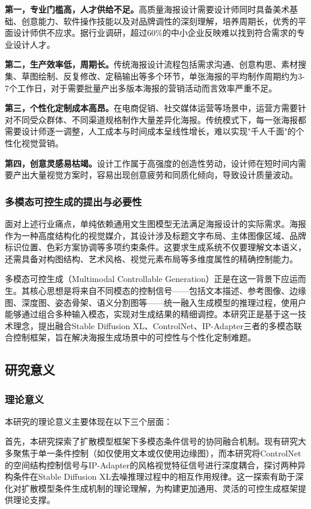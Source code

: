 \documentclass[12pt,a4paper]{ctexart}
\newcommand{\sdxl}{Stable Diffusion XL}
\newcommand{\controlnet}{ControlNet}
\newcommand{\ipadapter}{IP-Adapter}
\begin{document}
\textbf{第一，专业门槛高，人才供给不足。}高质量海报设计需要设计师同时具备美术基础、创意能力、软件操作技能以及对品牌调性的深刻理解，培养周期长，优秀的平面设计师供不应求。据行业调研，超过60\%的中小企业反映难以找到符合需求的专业设计人才。

\textbf{第二，生产效率低，周期长。}传统海报设计流程包括需求沟通、创意构思、素材搜集、草图绘制、反复修改、定稿输出等多个环节，单张海报的平均制作周期约为3-7个工作日，对于需要批量产出多版本海报的营销活动而言效率严重不足。

\textbf{第三，个性化定制成本高昂。}在电商促销、社交媒体运营等场景中，运营方需要针对不同受众群体、不同渠道规格制作大量差异化海报。传统模式下，每一张海报都需要设计师逐一调整，人工成本与时间成本呈线性增长，难以实现"千人千面"的个性化视觉营销。

\textbf{第四，创意灵感易枯竭。}设计工作属于高强度的创造性劳动，设计师在短时间内需要产出大量视觉方案时，容易出现创意疲劳和同质化倾向，导致设计质量波动。

\subsubsection{多模态可控生成的提出与必要性}

面对上述行业痛点，单纯依赖通用文生图模型无法满足海报设计的实际需求。海报作为一种高度结构化的视觉媒介，其设计涉及标题文字布局、主体图像区域、品牌标识位置、色彩方案协调等多项约束条件。这要求生成系统不仅要理解文本语义，还需具备对构图结构、艺术风格、视觉元素布局等多维度属性的精确控制能力。

多模态可控生成（Multimodal Controllable Generation）正是在这一背景下应运而生。其核心思想是将来自不同模态的控制信号——包括文本描述、参考图像、边缘图、深度图、姿态骨架、语义分割图等——统一融入生成模型的推理过程，使用户能够通过组合多种输入模态，实现对生成结果的精细调控。本研究正是基于这一技术理念，提出融合\sdxl{}、\controlnet{}、\ipadapter{}三者的多模态联合控制框架，旨在解决海报生成场景中的可控性与个性化定制难题。

\subsection{研究意义}

\subsubsection{理论意义}

本研究的理论意义主要体现在以下三个层面：

首先，本研究探索了扩散模型框架下多模态条件信号的协同融合机制。现有研究大多聚焦于单一条件控制（如仅使用文本或仅使用边缘图），而本研究将\controlnet{}的空间结构控制信号与\ipadapter{}的风格视觉特征信号进行深度耦合，探讨两种异构条件在\sdxl{}去噪推理过程中的相互作用规律。这一探索有助于深化对扩散模型条件生成机制的理论理解，为构建更加通用、灵活的可控生成框架提供理论支撑。
\end{document}
